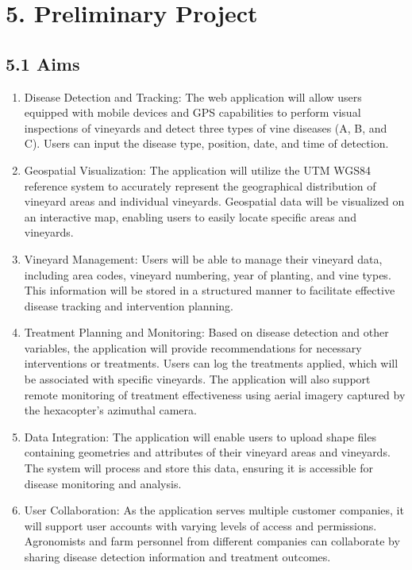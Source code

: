 

\section{5. Preliminary Project}

\subsection{5.1 Aims}
\begin{enumerate}
    \item Disease Detection and Tracking: The web application will allow users equipped with mobile devices and GPS capabilities to perform visual inspections of vineyards and detect three types of vine diseases (A, B, and C). Users can input the disease type, position, date, and time of detection.

    \item Geospatial Visualization: The application will utilize the UTM WGS84 reference system to accurately represent the geographical distribution of vineyard areas and individual vineyards. Geospatial data will be visualized on an interactive map, enabling users to easily locate specific areas and vineyards.

    \item Vineyard Management: Users will be able to manage their vineyard data, including area codes, vineyard numbering, year of planting, and vine types. This information will be stored in a structured manner to facilitate effective disease tracking and intervention planning.

    \item Treatment Planning and Monitoring: Based on disease detection and other variables, the application will provide recommendations for necessary interventions or treatments. Users can log the treatments applied, which will be associated with specific vineyards. The application will also support remote monitoring of treatment effectiveness using aerial imagery captured by the hexacopter's azimuthal camera.

    \item Data Integration: The application will enable users to upload shape files containing geometries and attributes of their vineyard areas and vineyards. The system will process and store this data, ensuring it is accessible for disease monitoring and analysis.

    \item User Collaboration: As the application serves multiple customer companies, it will support user accounts with varying levels of access and permissions. Agronomists and farm personnel from different companies can collaborate by sharing disease detection information and treatment outcomes.


\end{enumerate}
